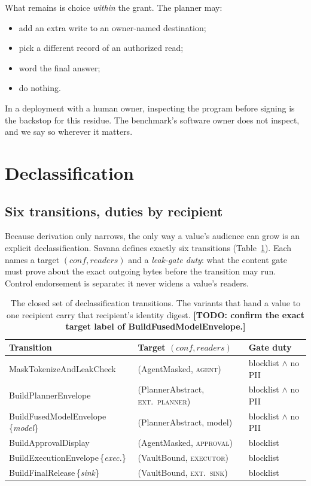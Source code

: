 \documentclass[letterpaper,twocolumn,10pt]{article}
\newcommand{\sys}{Savana}
\newcommand{\todo}[1]{{\color{red}\textbf{[TODO: #1]}}}
\newcommand{\conf}{\mathit{conf}}
\newcommand{\readers}{\mathit{readers}}
\begin{document}
What remains is choice \emph{within} the grant. The planner may:
\begin{itemize}
\item add an extra write to an owner-named destination;
\item pick a different record of an authorized read;
\item word the final answer;
\item do nothing.
\end{itemize}
In a deployment with a human owner, inspecting the program before signing
is the backstop for this residue. The benchmark's software owner does not
inspect, and we say so wherever it matters.

\section{Declassification}
\label{sec:declass}

\subsection{Six transitions, duties by recipient}

Because derivation only narrows, the only way a value's audience can grow
is an explicit declassification. \sys{} defines exactly six transitions
(Table~\ref{tab:transitions}). Each names a target $(\conf,\readers)$ and a
\emph{leak-gate duty}: what the content gate must prove about the exact
outgoing bytes before the transition may run. Control endorsement is
separate: it never widens a value's readers.

\begin{table}[t]
\centering\scriptsize
\begin{tabularx}{\columnwidth}{@{}lXl@{}}
\toprule
\textbf{Transition} & \textbf{Target $(\conf,\readers)$} & \textbf{Gate duty}\\
\midrule
\textsf{MaskTokenizeAndLeakCheck} & (\textsf{AgentMasked}, \textsc{agent}) & blocklist $\wedge$ no PII\\
\textsf{BuildPlannerEnvelope} & (\textsf{PlannerAbstract}, \textsc{ext.\ planner}) & blocklist $\wedge$ no PII\\
\textsf{BuildFusedModelEnvelope}\,\{\emph{model}\} & (\textsf{PlannerAbstract}, model) & blocklist $\wedge$ no PII\\
\textsf{BuildApprovalDisplay} & (\textsf{AgentMasked}, \textsc{approval}) & blocklist\\
\textsf{BuildExecutionEnvelope}\,\{\emph{exec.}\} & (\textsf{VaultBound}, \textsc{executor}) & blocklist\\
\textsf{BuildFinalRelease}\,\{\emph{sink}\} & (\textsf{VaultBound}, \textsc{ext.\ sink}) & blocklist\\
\bottomrule
\end{tabularx}
\caption{The closed set of declassification transitions. The variants that
hand a value to one recipient carry that recipient's identity digest.
\todo{confirm the exact target label of \textsf{BuildFusedModelEnvelope}.}}
\label{tab:transitions}
\end{table}
\end{document}
